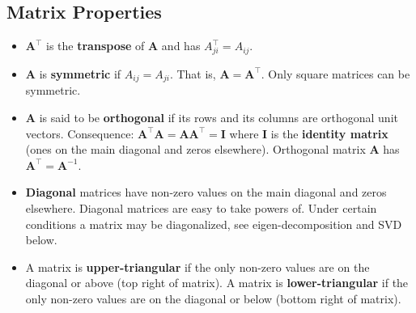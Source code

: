 \documentclass{harvardml}
\theoremstyle{definition}
\theoremstyle{plain}
\begin{document}
    \subsection{Matrix Properties}
        \begin{itemize}
            \item $\mathbf{A}^\top$ is the \textbf{transpose} of
				  $\mathbf{A}$ and has $A^\top_{ji} = A_{ij}$.
            \item $\mathbf{A}$ is \textbf{symmetric} if 
				  $A_{ij} = A_{ji}$. That is, $\mathbf{A} = \mathbf{A}^\top$.
                  Only square matrices can be symmetric.
            \item $\mathbf{A}$ is said to be \textbf{orthogonal}
                  if its rows and its columns are orthogonal unit vectors.
                  Consequence: $\mathbf{A}^\top\mathbf{A} = 
							   \mathbf{A}\mathbf{A}^\top = \mathbf{I}$
				  where $\mathbf{I}$ is the \textbf{identity matrix}
				  (ones on the main diagonal and zeros elsewhere).
				  Orthogonal matrix $\mathbf{A}$
				  has $\mathbf{A}^\top = \mathbf{A}^{-1}$.
            \item \textbf{Diagonal} matrices have non-zero values on the main
                  diagonal and zeros elsewhere. Diagonal matrices are easy to 
                  take powers of. Under certain conditions a matrix may be 
                  diagonalized, see eigen-decomposition and SVD below.

            \item A matrix is \textbf{upper-triangular} if the only non-zero
                  values are on the diagonal or above (top right of matrix).
                  A matrix is \textbf{lower-triangular} if the only non-zero
                  values are on the diagonal or below (bottom right of matrix).

            \end{itemize}
\end{document}

